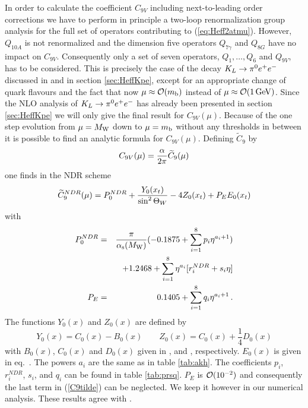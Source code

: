 In order to calculate the coefficient $C_{9V}$ including
next-to-leading order corrections we have to perform in principle a
two-loop renormalization group analysis for the full set of operators
contributing to (\ref{eq:Heff2atmu}). However, $Q_{10A}$ is not
renormalized and the dimension five operators $Q_{7\gamma}$ and
$Q_{8G}$ have no impact on $C_{9V}$. Consequently only a set of seven
operators, $Q_1,\ldots,Q_6$ and $Q_{9V}$, has to be considered. This is
precisely the case of the decay $K_L \to \pi^0 e^+ e^-$ discussed in \cite{burasetal:94a}
and in section \ref{sec:HeffKpe}, except for an appropriate change of quark
flavours and the fact that now $\mu\approx {\cal O}(m_{\rm b})$ instead of
$\mu\approx {\cal O}(1\, {\rm GeV})$. Since the NLO analysis of $K_L \to \pi^0 e^+ e^-$ has
already been presented in section \ref{sec:HeffKpe} we will only give the
final result for $C_{9V}(\mu)$. Because of the one step evolution from
$\mu=M_{\rm W}$ down to $\mu=m_{\rm b}$ without any thresholds in between it is
possible to find an analytic formula for $C_{9V}(\mu)$. Defining
$\tilde C_{9}$ by
\begin{equation} \label{C9}
C_{9V}(\mu) = \frac{\alpha}{2\pi} \widetilde C_9(\mu) 
\end{equation}
one finds \cite{burasmuenz:95} in the NDR scheme
\begin{equation}\label{C9tilde}
\widetilde C_9^{NDR}(\mu)  =  
P_0^{NDR} + \frac{Y_0(x_t)}{\sin^2\Theta_W} -4 Z_0(x_t) +
P_E E_0(x_t)
\end{equation}
with
\begin{eqnarray}
\label{P0NDR}
P_0^{NDR} & = & \frac{\pi}{\alpha_{\rm s}(M_{\rm W})} (-0.1875+ \sum_{i=1}^8 p_i
\eta^{a_i+1}) \nonumber \\ 
          &   & + 1.2468 +  \sum_{i=1}^8 \eta^{a_i} \lbrack
r^{NDR}_i+s_i \eta \rbrack \\ 
\label{PE}
P_E & = & 0.1405 +\sum_{i=1}^8 q_i\eta^{a_i+1}  \, .
\end{eqnarray}
The functions $Y_0(x)$ and $Z_0(x)$ are defined by
\begin{equation}
Y_0(x) = C_0(x) - B_0(x)
\qquad
Z_0(x) = C_0(x) + \frac{1}{4} D_0(x)
\label{eq:yz0}
\end{equation}
with $B_0(x)$, $C_0(x)$ and $D_0(x)$ given in ,
 and , respectively. $E_0(x)$ is given in
eq.\ . The powers $a_i$ are the same as in table
\ref{tab:akh}.  The coefficients $p_i$, $r^{NDR}_i$, $s_i$, and $q_i$
can be found in table \ref{tab:prsq}.  $P_E$ is ${\cal O}(10^{-2})$ and
consequently the last term in (\ref{C9tilde}) can be neglected. We keep
it however in our numerical analysis. These results agree with
\cite{misiak:94}.

